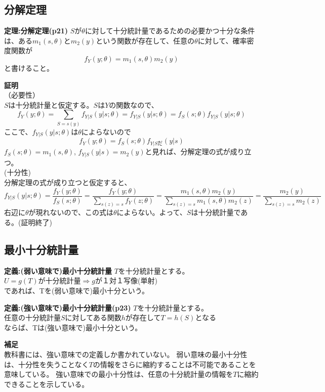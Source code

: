 \documentclass[10pt]{jarticle}
\begin{document}
\subsection{分解定理}
\begin{itembox}[l]{\textbf{定理:分解定理(p21)}}
$S$が$\theta$に対して十分統計量であるための必要かつ十分な条件は、ある$m_1(s,\theta)$と$m_2(y)$という関数が存在して、任意の$\theta$に対して、確率密度関数が
\[f_Y(y;\theta)=m_1(s,\theta)m_2(y)\]
と書けること。
\end{itembox}
\textbf{証明}\\
（必要性）\\
$S$は十分統計量と仮定する。$S$は$Y$の関数なので、
\[f_Y(y;\theta)=\sum_{S=s(y)}f_{Y|S}(y|s;\theta)=f_{Y|S}(y|s;\theta)=f_S(s;\theta)f_{Y|S}(y|s;\theta)\]
ここで、$f_{Y|S}(y|s;\theta)$は$\theta$によらないので
\[f_Y(y;\theta)=f_S(s;\theta)f_{Y|Sだ}(y|s)\]
$f_S(s;\theta)=m_1(s,\theta)$,   $f_{Y|S}(y|s)=m_2(y)$と見れば、分解定理の式が成り立つ。
\[\]
(十分性)\\
分解定理の式が成り立つと仮定すると、
\[f_{Y|S}(y|s;\theta)=\frac{f_Y(y;\theta)}{f_S(s;\theta)}=\frac{f_Y(y;\theta)}{\sum_{s(z)=s}f_Y(z;\theta)}=\frac{m_1(s,\theta)m_2(y)}{\sum_{s(z)=s}m_1(s,\theta)m_2(z)}
=\frac{m_2(y)}{\sum_{s(z)=s}m_2(z)}\]
右辺に$\theta$が現れないので、この式は$\theta$によらない。よって、$S$は十分統計量である。(証明終了)


\subsection{最小十分統計量}
\begin{itembox}[l]{\textbf{定義:(弱い意味で)最小十分統計量}}
$T$を十分統計量とする。\\
$U=g(T)$が十分統計量$\Rightarrow$$g$が１対１写像(単射)\\
であれば、Tを(弱い意味で)最小十分という。
\end{itembox}


\begin{itembox}[l]{\textbf{定義:(強い意味で)最小十分統計量(p23)}}
$T$を十分統計量とする。\\
任意の十分統計量$S$に対してある関数$h$が存在して$T=h(S)$となる\\
ならば、Tは(強い意味で)最小十分という。
\end{itembox}
\textbf{補足}\\
教科書には、強い意味での定義しか書かれていない。
弱い意味の最小十分性は、十分性を失うことなく$T$の情報をさらに縮約することは不可能であることを意味している。
強い意味での最小十分性は、任意の十分統計量の情報を$T$に縮約できることを示している。\\
\end{document}
